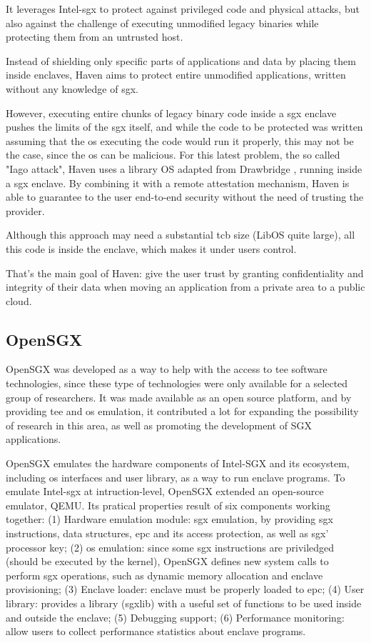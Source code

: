 It leverages Intel-\gls{sgx} to protect against privileged code and physical attacks, but also against the challenge of executing unmodified legacy binaries while protecting them from an untrusted host.

Instead of shielding only specific parts of applications and data by placing them inside enclaves, Haven aims to protect entire unmodified applications, written without any knowledge of \gls{sgx}. 

However, executing entire chunks of legacy binary code inside a \gls{sgx} enclave pushes the limits of the \gls{sgx} itself, and while the code to be protected was written assuming that the \gls{os} executing the code would run it properly, this may not be the case, since the \gls{os} can be malicious. For this latest problem, the so called "Iago attack", Haven uses a library OS adapted from Drawbridge \cite{drawbridge}, running inside a \gls{sgx} enclave. 
By combining it with a remote attestation mechanism, Haven is able to guarantee to the user end-to-end security without the need of trusting the provider.

Although this approach may need a substantial \gls{tcb} size (LibOS quite large), all this code is inside the enclave, which makes it under users control. 

That's the main goal of Haven: give the user trust by granting confidentiality and integrity of their data when moving an application from a private area to a public cloud. 


\subsection{OpenSGX}
\label{ssec:openSGX}

OpenSGX \cite{opensgx_paper} was developed as a way to help with the access to \gls{tee} software technologies, since these type of technologies were only available for a selected group of researchers. 
It was made available as an open source platform, and by providing \gls{tee} and \gls{os} emulation, it contributed a lot for expanding the possibility of research in this area, as well as promoting the development of SGX applications. 

OpenSGX emulates the hardware components of Intel-SGX and its ecosystem, including \gls{os} interfaces and user library, as a way to run enclave programs. To emulate Intel-\gls{sgx} at intruction-level, OpenSGX extended an open-source emulator, QEMU.
Its pratical properties result of six components working together: (1) Hardware emulation module: \gls{sgx} emulation, by providing \gls{sgx} instructions, data structures, \gls{epc} and its access protection, as well as \gls{sgx}' processor key; (2) \gls{os} emulation: since some \gls{sgx} instructions are priviledged (should be executed by the kernel), OpenSGX defines new system calls to perform \gls{sgx} operations, such as dynamic memory allocation and enclave provisioning; (3) Enclave loader: enclave must be properly loaded to \gls{epc}; (4) User library: provides a library (sgxlib) with a useful set of functions to be used inside and outside the enclave; (5) Debugging support; (6) Performance monitoring: allow users to collect performance statistics about enclave programs.

